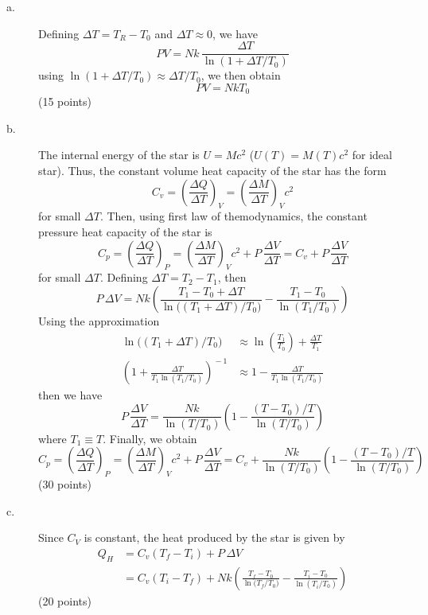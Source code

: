 \begin{description}
\item[a.] Defining $\Delta T = T_R - T_0$ and $\Delta T \approx 0$, we have
  \[
    PV = Nk\,\frac{\Delta T}{\ln(1 + \Delta T/T_0)} \tag{3}
  \]
  using $\ln(1 + \Delta T/T_0) \approx \Delta T/T_0$, we then obtain
  \[
    PV = NkT_0 \tag{4}
  \]
  \hfill(15 points)
\item[b.] The internal energy of the star is $U = Mc^2$ ($U(T) = M(T)c^2$ for
  ideal star). Thus, the constant volume heat capacity of the star has the form
  \[
    C_v = \left(\frac{\Delta Q}{\Delta T}\right)_{\!V}
        = \left(\frac{\Delta M}{\Delta T}\right)_{\!V} c^2
  \]
  for small $\Delta T$. Then, using first law of themodynamics, the constant
  pressure heat capacity of the star is
  \[
    C_p = \left(\frac{\Delta Q}{\Delta T}\right)_{\!P}
        = \left(\frac{\Delta M}{\Delta T}\right)_{\!V} c^2 + P\,\frac{\Delta V}{\Delta T}
        = C_v + P\,\frac{\Delta V}{\Delta T}
  \]
  for small $\Delta T$. Defining $\Delta T = T_2 - T_1$, then
  \[
    P\,\Delta V = Nk\left(
      \frac{T_1 - T_0 + \Delta T}{\ln\!\big((T_1 + \Delta T)/T_0\big)}
      - \frac{T_1 - T_0}{\ln(T_1/T_0)}\right)
  \]
  Using the approximation
  \begin{align*}
    \ln\!\big((T_1 + \Delta T)/T_0\big)
      &\approx \ln\!\left(\frac{T_1}{T_0}\right) + \frac{\Delta T}{T_1} \\
    \left(1 + \frac{\Delta T}{T_1\ln(T_1/T_0)}\right)^{\!-1}
      &\approx 1 - \frac{\Delta T}{T_1\ln(T_1/T_0)}
  \end{align*}
  then we have
  \[
    P\,\frac{\Delta V}{\Delta T}
      = \frac{Nk}{\ln(T/T_0)}\left(1 - \frac{(T - T_0)/T}{\ln(T/T_0)}\right)
  \]
  where $T_1 \equiv T$. Finally, we obtain
  \[
    C_p = \left(\frac{\Delta Q}{\Delta T}\right)_{\!P}
        = \left(\frac{\Delta M}{\Delta T}\right)_{\!V} c^2 + P\,\frac{\Delta V}{\Delta T}
        = C_v + \frac{Nk}{\ln(T/T_0)}\left(1 - \frac{(T - T_0)/T}{\ln(T/T_0)}\right)
  \]
  \hfill(30 points)
\item[c.] Since $C_V$ is constant, the heat produced by the star is given by
  \begin{align*}
    Q_H &= C_v\left(T_f - T_i\right) + P\,\Delta V \\
        &= C_v\left(T_i - T_f\right) %
         + Nk\left(\frac{T_f - T_0}{\ln\!\big(T_f/T_0\big)}
         - \frac{T_i - T_0}{\ln(T_i/T_0)}\right)
  \end{align*}
  \hfill(20 points)

\end{description}
